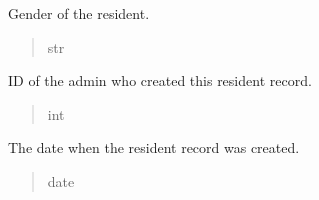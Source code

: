 \documentclass[letterpaper,10pt,english]{sphinxmanual}
\begin{document}
\begin{fulllineitems}
\begin{fulllineitems}
\begin{quote}
\begin{description}
\end{description}\end{quote}

\end{fulllineitems}


\begin{fulllineitems}
\label{\detokenize{app.models:app.models.resident.Resident.gender}}
\pysigstartsignatures
\pysigline
{}
\pysigstopsignatures
\sphinxAtStartPar
Gender of the resident.
\begin{quote}\begin{description}
\sphinxAtStartPar
str

\end{description}\end{quote}

\end{fulllineitems}


\begin{fulllineitems}
\label{\detokenize{app.models:app.models.resident.Resident.createdBy}}
\pysigstartsignatures
\pysigline
{}
\pysigstopsignatures
\sphinxAtStartPar
ID of the admin who created this resident record.
\begin{quote}\begin{description}
\sphinxAtStartPar
int

\end{description}\end{quote}

\end{fulllineitems}


\begin{fulllineitems}
\label{\detokenize{app.models:app.models.resident.Resident.createDate}}
\pysigstartsignatures
\pysigline
{}
\pysigstopsignatures
\sphinxAtStartPar
The date when the resident record was created.
\begin{quote}\begin{description}
\sphinxAtStartPar
date


\end{description}
\end{quote}
\end{fulllineitems}
\end{fulllineitems}
\end{document}
